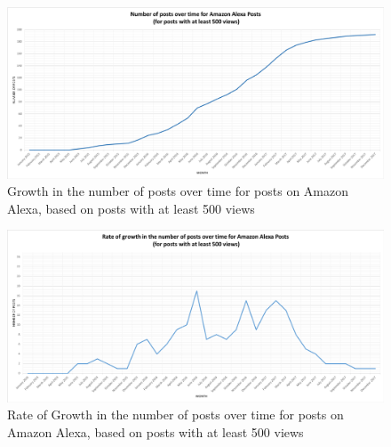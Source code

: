 \documentclass{sigchi}
\begin{document}
\begin{figure}[ht]
	\centering
\includegraphics[width=\textwidth,height=\textheight,keepaspectratio]{RQ6-AmazonNumPostsOverTime_500Views.png}
    \caption{Growth in the number of posts over time for posts on Amazon Alexa, based on posts with at least 500 views}
    \label{fig:8AmazonGrowthInNumPosts500Views}
\end{figure}
\begin{figure}[ht]
	\centering
\includegraphics[width=\textwidth,height=\textheight,keepaspectratio]{RQ6-AmazonRateNumPostsOverTime_500Views.png}
    \caption{Rate of Growth in the number of posts over time for posts on Amazon Alexa, based on posts with at least 500 views}
    \label{fig:8.1AmazonRateGrowthInNumPosts500Views}
\end{figure}
\end{document}
